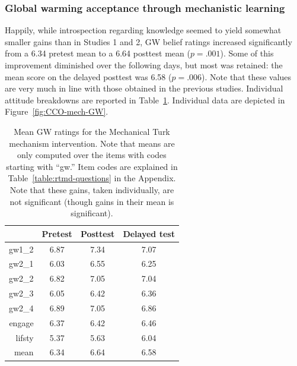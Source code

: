 \subsubsection{Global warming acceptance through mechanistic learning}

Happily, while introspection regarding knowledge seemed to yield somewhat
smaller gains than in Studies 1 and 2, GW belief ratings increased significantly
from a 6.34 pretest mean to a 6.64 posttest mean ($p=.001$). Some of this
improvement diminished over the following days, but most was retained: the mean
score on the delayed posttest was 6.58 ($p=.006$). Note that these values are
very much in line with those obtained in the previous studies. Individual
attitude breakdowns are reported in Table~\ref{table:CCO-mech-gw-means}.
Individual data are depicted in Figure~\ref{fig:CCO-mech-GW}.

\begin{table}
\caption{Mean GW ratings for the Mechanical Turk mechanism intervention. Note
    that means are only computed over the items with codes starting with
    “\textsf{gw}.” Item codes are explained in Table~\ref{table:rtmd-questions}
    in the Appendix. Note that these gains, taken individually, are not
    significant (though gains in their mean is significant).}
\label{table:CCO-mech-gw-means}
\centering
\begin{tabular}{>{\sffamily}rccc}
  \toprule
         & Pretest & Posttest & Delayed test \\ 
  \midrule
  gw1_2 & 6.87 & 7.34 & 7.07 \\ 
  gw2_1 & 6.03 & 6.55 & 6.25 \\ 
  gw2_2 & 6.82 & 7.05 & 7.04 \\ 
  gw2_3 & 6.05 & 6.42 & 6.36 \\ 
  gw2_4 & 6.89 & 7.05 & 6.86 \\ 
  engage & 6.37 & 6.42 & 6.46 \\ 
  lifsty & 5.37 & 5.63 & 6.04 \\ 
  \midrule
  \textrm{mean} & 6.34 & 6.64 & 6.58 \\
   \bottomrule
\end{tabular}
\end{table}

